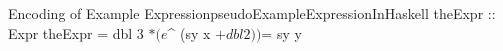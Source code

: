 \begin{pseudohaskell}{Encoding of Example Expression}{pseudoExampleExpressionInHaskell}
theExpr :: Expr
theExpr = dbl 3 $* (e $^ (sy x $+ dbl 2)) $= sy y
\end{pseudohaskell}
